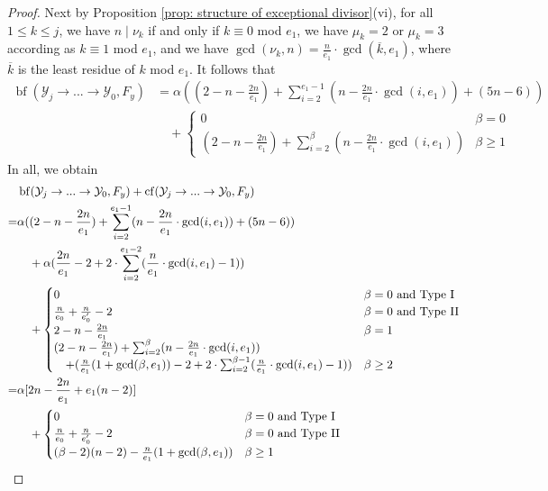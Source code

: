 \documentclass[12pt]{amsart}
\numberwithin{equation}{section}
\theoremstyle{definition}
\renewcommand{\c}[1]{\overline{#1}}
\newcommand{\Y}{\mathcal{Y}}
\newcommand{\tx}[1]{\text{#1}}
\DeclareMathOperator{\blf}{bf}
\DeclareMathOperator{\cf}{cf}
\begin{document}
\begin{proof}
    Next by Proposition \ref{prop: structure of exceptional divisor}(vi), for all $1\leq k\leq j$, we have $n\mid\nu_k$ if and only if $k\equiv 0$ mod $e_1$, we have $\mu_k=2$ or $\mu_k=3$ according as $k\equiv 1$ mod $e_1$, and we have $\gcd(\nu_k,n)=\frac{n}{e_1}\cdot\gcd(\c{k},e_1)$, where $\c{k}$ is the least residue of $k$ mod $e_1$. It follows that
    \begin{align*}
    \blf(\Y_j\to...\to\Y_0,F_y)
    &=\alpha((2-n-\frac{2n}{e_1})+\sum_{i=2}^{e_1-1}(n-\frac{2n}{e_1}\cdot\gcd(i,e_1))+(5n-6))\\
    &\quad+\begin{cases}
    0&\beta=0\\
    (2-n-\frac{2n}{e_1})+\sum_{i=2}^{\beta}(n-\frac{2n}{e_1}\cdot\gcd(i,e_1))&\beta\geq1\end{cases}
    \end{align*}
    In all, we obtain
    \begin{align*}
    &\blf(\Y_j\to...\to\Y_0,F_y)+\cf(\Y_j\to...\to\Y_0,F_y)\\
    =&\alpha((2-n-\frac{2n}{e_1})+\sum_{i=2}^{e_1-1}(n-\frac{2n}{e_1}\cdot\gcd(i,e_1))+(5n-6))\\
    &\quad+\alpha(\frac{2n}{e_1}-2+2\cdot\sum_{i=2}^{e_1-2}(\frac{n}{e_1}\cdot\gcd(i,e_1)-1))\\
    &\quad+\begin{cases}
            0& \beta=0\tx{ and Type I}\\
            \frac{n}{e_0}+\frac{n}{e_0'}-2&\beta=0\tx{ and Type II}\\
            2-n-\frac{2n}{e_1}&\beta=1\\
            (2-n-\frac{2n}{e_1})+\sum_{i=2}^{\beta}(n-\frac{2n}{e_1}\cdot\gcd(i,e_1))&\\
            \quad+(\frac{n}{e_1}(1+\gcd(\beta,e_1))-2+2\cdot\sum_{i=2}^{\beta-1}(\frac{n}{e_1}\cdot\gcd(i,e_1)-1))&\beta\geq 2
    \end{cases}\\
    =&\alpha[2n-\frac{2n}{e_1}+e_1(n-2)]\\
    &\quad+\begin{cases}
            0& \beta=0\tx{ and Type I}\\
            \frac{n}{e_0}+\frac{n}{e_0'}-2&\beta=0\tx{ and Type II}\\
            (\beta-2)(n-2)-\frac{n}{e_1}(1+\gcd(\beta,e_1))&\beta\geq 1
    \end{cases}\qedhere
    \end{align*}
\end{proof}
\end{document}

